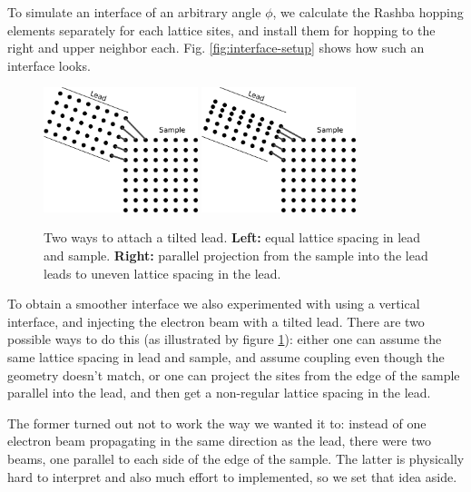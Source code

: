 To simulate an interface of an arbitrary angle $\phi$, we calculate the Rashba
hopping elements separately for each lattice sites, and install them for
hopping to the right and upper neighbor each. Fig. \ref{fig:interface-setup}
shows how such an interface looks.

\begin{figure}
    \begin{center}
        \includegraphics[width=0.4\textwidth]{lead-tilted-1.pdf}
        \hspace{0.1\textwidth}
        \includegraphics[width=0.4\textwidth]{lead-tilted-2.pdf}
    \end{center}
    \caption{Two ways to attach a tilted lead. \textbf{Left:} equal lattice
        spacing in lead and sample. \textbf{Right:} parallel projection from
        the sample into the lead leads to uneven lattice spacing in the lead.}
    \label{fig:tilted-leads}
\end{figure}

To obtain a smoother interface we also experimented with using a vertical
interface, and
injecting the electron beam with a tilted lead. There are two possible
ways to do this (as illustrated by figure \ref{fig:tilted-leads}):
either one can assume the same lattice spacing in lead and sample, and assume
coupling even though the geometry doesn't match, or one can project the sites
from the edge of the sample parallel into the lead, and then get a non-regular
lattice spacing in the lead.

The former turned out not to work the way we wanted it to: instead of one
electron beam propagating in the same direction as the lead, there were two
beams, one parallel to each side of the edge of the sample. The latter is
physically hard to interpret and also much effort to implemented, so we set
that idea aside.


